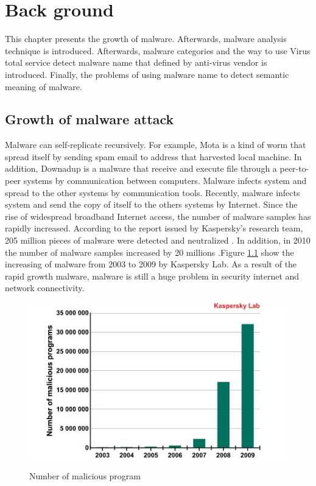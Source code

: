 
\chapter{Back ground}\label{chap:2}
This chapter presents the growth of malware. Afterwards, malware analysis technique is introduced. Afterwards, malware categories and the way to use Virus total service detect malware name that defined by anti-virus vendor is introduced. Finally, the problems of using malware name to detect semantic meaning of malware. 
%
%
\section{Growth of malware attack}
Malware can self-replicate recursively. For example, Mota is a kind of worm that spread itself by sending spam email to address that harvested local machine. In addition, Downadup is a malware that receive and execute file through a peer-to-peer systems by communication between computers. Malware infects system and spread to the other systems by communication tools. Recently, malware infects system and send the copy of itself to the others systems by Internet.
Since the rise of widespread broadband Internet access, the number of malware samples has rapidly increased. According to the report issued by Kaspersky's research team, 205 million pieces of malware were detected and neutralized \cite{kaspersky1}. In addition, in 2010 the number of malware samples increased by 20 millions \cite{kaspersky}.Figure \ref{fig:kaspersky} show the increasing of malware from 2003 to 2009 by Kaspersky Lab. As a result of the rapid growth malware, malware is still a huge problem in security internet and network connectivity. 
\begin{figure}[h!]
\centering
\includegraphics[width=1\textwidth]{graph/kapersky.jpg}
\caption{Number of malicious program}\cite{kaspersky}
\label{fig:kaspersky}
\end{figure}
